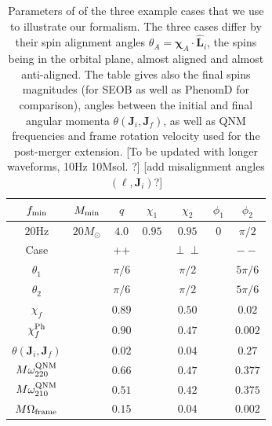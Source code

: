 \documentclass[aps,showpacs,twocolumn,
prd,superscriptaddress,nofootinbib]{revtex4-1}
\newcommand{\Msol}{M_{\odot}}
\newcommand{\SM}[1]{{\color{Red} #1}}
\begin{document}

\begin{table}[t]
\begin{ruledtabular}\caption{Parameters of of the three example cases that we use to illustrate our formalism. The three cases differ by their spin alignment angles $\theta_{A} = \bm{\chi}_{A} \cdot \hat{\bm{L}}_{i}$, the spins being in the orbital plane, almost aligned and almost anti-aligned. The table gives also the final spins magnitudes (for SEOB as well as PhenomD for comparison), angles between the initial and final angular momenta $\theta(\bm{J}_{i}, \bm{J}_{f})$, as well as QNM frequencies and frame rotation velocity used for the post-merger extension. \SM{[To be updated with longer waveforms, 10Hz 10Msol. ?]} \SM{[add misalignment angles $(\ell, \bm{J}_{i})$?]}}\label{tab:precparams}
\begin{tabular}{ccccccc}\label{tab:precexamples}
	$f_{\rm min}$ & $ M_{\rm min} $ & $q$ & $\chi_{1}$ & $\chi_{2}$ & $ \phi_{1} $ & $ \phi_{2} $ \\
	\hline
	$20\mathrm{Hz}$ & $20\Msol$ & $ 4.0 $ & $ 0.95 $ & $ 0.95 $ & $0$ & $\pi/2$ \\
	\hline\hline
	Case && ++ && $\perp\perp$ && $--$ \\
	\hline
	$\theta_{1}$ && $\pi/6$ && $\pi/2$ && $5\pi/6$ \\
	$\theta_{2}$ && $\pi/6$ && $\pi/2$ && $5\pi/6$ \\
	\hline
	$\chi_{f}$ && $0.89$ && $0.50$ && $0.02$ \\
	$\chi_{f}^{\rm Ph}$ && $0.90$ && $0.47$ && $0.002$ \\
	$\theta(\bm{J}_{i}, \bm{J}_{f})$ && $0.02$ && $0.04$ && $0.27$ \\
	$M \omega_{220}^{\rm QNM}$ && $0.66$ && $0.47$ && $0.377$ \\
	$M \omega_{210}^{\rm QNM}$ && $0.51$ && $0.42$ && $0.375$ \\
	$M \Omega_{\rm frame}$ && $0.15$ && $0.04$ && $0.002$ \\
\end{tabular}
\end{ruledtabular}
\end{table}
\end{document}
